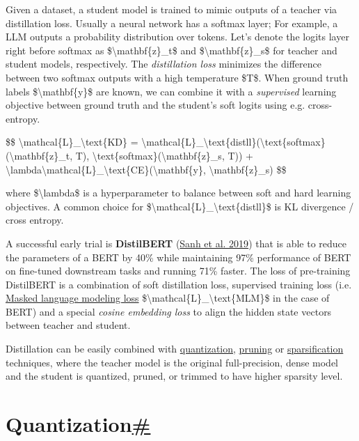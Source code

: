 Given a dataset, a student model is trained to mimic outputs of a teacher via distillation loss. Usually a neural network has a softmax layer; For example, a LLM outputs a probability distribution over tokens. Let's denote the logits layer right before softmax as \$\textbackslash mathbf\{z\}\_t\$ and \$\textbackslash mathbf\{z\}\_s\$ for teacher and student models, respectively. The \emph{distillation loss} minimizes the difference between two softmax outputs with a high temperature \$T\$. When ground truth labels \$\textbackslash mathbf\{y\}\$ are known, we can combine it with a \emph{supervised} learning objective between ground truth and the student's soft logits using e.g. cross-entropy.

\$\$ \textbackslash mathcal\{L\}\_\textbackslash text\{KD\} = \textbackslash mathcal\{L\}\_\textbackslash text\{distll\}(\textbackslash text\{softmax\}(\textbackslash mathbf\{z\}\_t, T), \textbackslash text\{softmax\}(\textbackslash mathbf\{z\}\_s, T)) + \textbackslash lambda\textbackslash mathcal\{L\}\_\textbackslash text\{CE\}(\textbackslash mathbf\{y\}, \textbackslash mathbf\{z\}\_s) \$\$

where \$\textbackslash lambda\$ is a hyperparameter to balance between soft and hard learning objectives. A common choice for \$\textbackslash mathcal\{L\}\_\textbackslash text\{distll\}\$ is KL divergence / cross entropy.

A successful early trial is \textbf{DistilBERT} (\href{https://arxiv.org/abs/1910.01108}{Sanh et al. 2019}) that is able to reduce the parameters of a BERT by 40\% while maintaining 97\% performance of BERT on fine-tuned downstream tasks and running 71\% faster. The loss of pre-training DistilBERT is a combination of soft distillation loss, supervised training loss (i.e. \href{https://lilianweng.github.io/posts/2019-01-31-lm/\#MLM}{Masked language modeling loss} \$\textbackslash mathcal\{L\}\_\textbackslash text\{MLM\}\$ in the case of BERT) and a special \emph{cosine embedding loss} to align the hidden state vectors between teacher and student.

Distillation can be easily combined with \hyperref[quantization]{quantization}, \hyperref[pruning]{pruning} or \hyperref[sparsity]{sparsification} techniques, where the teacher model is the original full-precision, dense model and the student is quantized, pruned, or trimmed to have higher sparsity level.

\section{\texorpdfstring{Quantization\hyperref[quantization]{\#}}{Quantization\#}}\label{quantization}

